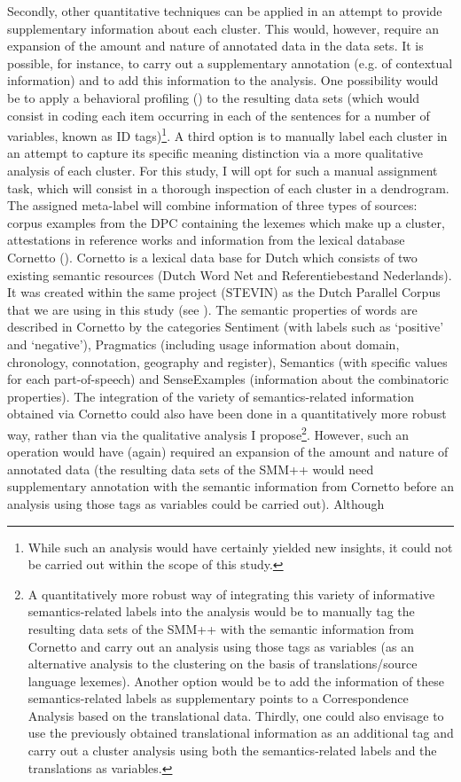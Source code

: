 Secondly, other quantitative techniques can be applied in an attempt to provide supplementary information about each cluster. This would, however, require an expansion of the amount and nature of annotated data in the data sets. It is possible, for instance, to carry out a supplementary annotation (e.g. of contextual information) and to add this information to the analysis. One possibility would be to apply a behavioral profiling (\citealt{divjak_ways_2006, divjak_clusters_2008, evans_behavioral_2009}) to the resulting data sets (which would consist in coding each item occurring in each of the sentences for a number of variables, known as ID tags)\footnote{While such an analysis would have certainly yielded new insights, it could not be carried out within the scope of this study.}. A third option is to manually label each cluster in an attempt to capture its specific meaning distinction via a more qualitative analysis of each cluster. For this study, I will opt for such a manual assignment task, which will consist in a thorough inspection of each cluster in a dendrogram. The assigned meta-label will combine information of three types of sources: corpus examples from the DPC containing the lexemes which make up a cluster, attestations in reference works and information from the lexical database Cornetto (\citealt{vossen_cornetto_2008, spyns_cornetto:_2013}). Cornetto is a lexical data base for Dutch which consists of two existing semantic resources (Dutch Word Net and Referentiebestand Nederlands). It was created within the same project (STEVIN) as the Dutch Parallel Corpus that we are using in this study (see ). The semantic properties of words are described in Cornetto by the categories Sentiment (with labels such as ‘positive’ and ‘negative’), Pragmatics (including usage information about domain, chronology, connotation, geography and register), Semantics (with specific values for each part-of-speech) and SenseExamples (information about the combinatoric properties). The integration of the variety of semantics-related information obtained via Cornetto could also have been done in a quantitatively more robust way, rather than via the qualitative analysis I propose\footnote{A quantitatively more robust way of integrating this variety of informative semantics-related labels into the analysis would be to manually tag the resulting data sets of the SMM++ with the semantic information from Cornetto and carry out an analysis using those tags as variables (as an alternative analysis to the clustering on the basis of translations/source language lexemes). Another option would be to add the information of these semantics-related labels as supplementary points to a Correspondence Analysis based on the translational data. Thirdly, one could also envisage to use the previously obtained translational information as an additional tag and carry out a cluster analysis using both the semantics-related labels and the translations as variables.}. However, such an operation would have (again) required an expansion of the amount and nature of annotated data (the resulting data sets of the SMM++ would need supplementary annotation with the semantic information from Cornetto before an analysis using those tags as variables could be carried out). Although 